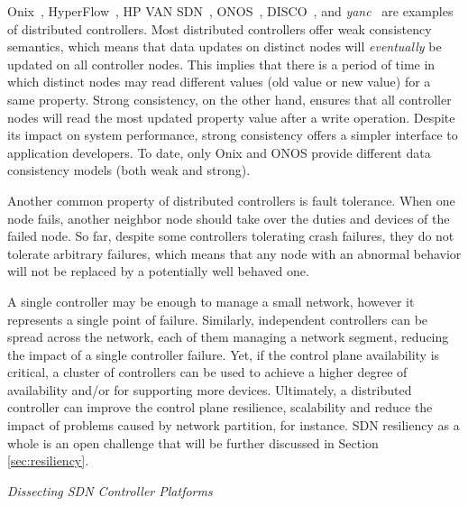 Onix~\cite{koponen-1}, HyperFlow~\cite{tootoonchian2010},
HP VAN SDN~\cite{hp2013-1}, ONOS~\cite{krishnaswamy2013}, DISCO~\cite{phemius2013},
and \textit{yanc}~\cite{monaco2013} are examples of distributed controllers. 
Most distributed controllers offer weak consistency semantics, which means that data updates on distinct nodes will \emph{eventually} be updated on 
all controller nodes.
This implies that there is a period of time in which distinct nodes may read different 
values (old value or new value) for a same property.
Strong consistency, on the other hand, ensures that all 
controller nodes will read the most updated property value after a write operation.
Despite its impact on system performance, strong consistency offers a simpler interface to application developers.
To date, only Onix and ONOS provide different data consistency models (both weak and strong). 


Another common property of distributed controllers is fault tolerance.
When one node fails, another neighbor node should take over the duties and devices of the failed node. 
So far, despite some controllers tolerating crash failures, they do not tolerate
arbitrary failures, which means that any node with an abnormal behavior will not be replaced by a potentially 
well behaved one.

A single controller may be enough to manage a small network, however it represents a single point 
of failure.
Similarly, independent controllers can be spread across the network, each of them managing 
a network segment, reducing the impact of a single controller failure. Yet, if the control plane
availability is critical, a cluster of controllers can be used to achieve a higher degree of availability 
and/or for supporting more devices.
Ultimately, a distributed controller can improve the control plane 
resilience, scalability and reduce the impact of problems caused by network partition, for instance.
SDN resiliency as a whole is an open challenge that will be further discussed in Section \ref{sec:resiliency}.

\vspace{2mm}
\noindent \textit{Dissecting SDN Controller Platforms}
\vspace{2mm}


